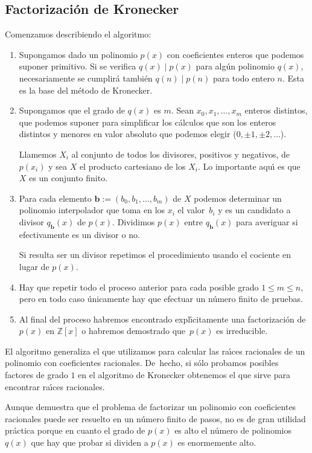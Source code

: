 \subsection{Factorizaci\'on de Kronecker}\label{kron}
Comenzamos describiendo el algoritmo:
\begin{enumerate}
 \item Supongamos dado un polinomio $p(x)$ con coeficientes enteros que podemos
suponer primitivo. Si se verifica $q(x)\mid p(x)$ para alg\'un polinomio $q(x)$,
necesariamente se cumplir\'a tambi\'en $q(n)\mid p(n)$ para todo entero $n$.
Esta es la base del m\'etodo de Kronecker.
\item Supongamos que el grado de $q(x)$ es $m$. Sean $x_0, x_1,\dots,x_m$
enteros distintos, que podemos suponer para simplificar los c\'alculos que son
los enteros distintos y menores en valor absoluto que podemos elegir ($0,\pm
1,\pm 2,\dots$).

Llamemos $X_i$ al conjunto de todos los divisores, positivos y negativos, de
$p(x_i)$ y sea $X$ el producto cartesiano de los $X_i$. Lo importante aqu\'{\i}
es que $X$ es un conjunto finito.

\item Para cada elemento $\mathbf{b}:=(b_0,b_1,\dots,b_m)$ de $X$ podemos
determinar un polinomio interpolador que toma en los $x_i$ el valor~$b_i$ y es
un candidato a divisor $q_{\mathbf{b}}(x)$ de $p(x)$. Dividimos $p(x)$ entre
$q_{\mathbf{b}}(x)$ para averiguar si efectivamente es un divisor o no. 

Si resulta ser un divisor repetimos el procedimiento usando el cociente en lugar
de $p(x)$. 
\item Hay que repetir todo el proceso anterior para cada posible grado $1\le m
\le n$, pero en todo caso \'unicamente hay que efectuar un n\'umero finito de
pruebas. 
\item Al final del proceso habremos encontrado expl\'{\i}citamente una
factorizaci\'on de $p(x)$ en $\mathbb{Z}[x]$ o habremos demostrado que~$p(x)$ es
irreducible.
\end{enumerate}


El algoritmo generaliza el que utilizamos para calcular las ra\'{\i}ces
racionales de un polinomio con coeficientes racionales. De~hecho, si s\'olo
probamos posibles factores de grado $1$ en el algoritmo de Kronecker obtenemos
el que sirve para encontrar ra\'{\i}ces racionales.


Aunque demuestra que el problema de factorizar un polinomio con coeficientes
racionales puede ser resuelto en un n\'umero finito de pasos, no es de gran
utilidad pr\'actica porque en cuanto el grado de $p(x)$ es alto el n\'umero de
polinomios $q(x)$ que hay que probar si dividen a $p(x)$ es enormemente alto.

